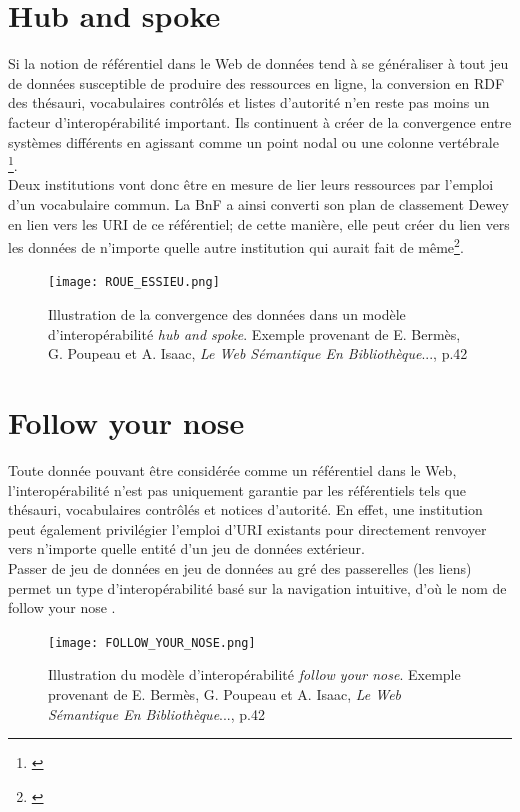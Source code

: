 \documentclass[a4paper,12pt,twoside]{book}
\begin{document}
\section{\og Hub and spoke\fg}
Si la notion de référentiel dans le Web de données tend à se généraliser à tout jeu de données susceptible de produire des ressources en ligne, la conversion en RDF des thésauri, vocabulaires contrôlés et listes d'autorité n'en reste pas moins un facteur d'interopérabilité important. Ils continuent à créer de la convergence entre systèmes différents en agissant \og comme un point nodal ou une colonne vertébrale \fg\footnote{\cite[p.~41]{bermesWebSemantiqueBibliotheque2013}}.\\

Deux institutions vont donc être en mesure de lier leurs ressources par l'emploi d'un vocabulaire commun. La BnF a ainsi converti son plan de classement Dewey en lien vers les URI de ce référentiel; de cette manière, elle peut créer du lien vers les données de n'importe quelle autre institution qui aurait fait de même\footnote{\cite[p.~54]{bermesWebSemantiqueBibliotheque2013}}. 

\begin{figure}[h]
    \centering
    \texttt{[image: ROUE\_ESSIEU.png]}
    \caption{Illustration de la convergence des données dans un modèle d'interopérabilité \textit{hub and spoke}. Exemple provenant de E. Bermès, G. Poupeau et A. Isaac, \textit{Le Web Sémantique En Bibliothèque}..., p.42}
    \label{fig:enter-label}
\end{figure}


\section{\og Follow your nose \fg}
Toute donnée pouvant être considérée comme un référentiel dans le Web, l'interopérabilité n'est pas uniquement garantie par les référentiels tels que thésauri, vocabulaires contrôlés et notices d'autorité. En effet, une institution peut également privilégier l'emploi d'URI existants pour directement renvoyer vers n'importe quelle entité d'un jeu de données extérieur.\\

Passer de jeu de données en jeu de données au gré des passerelles (les liens) permet un type d'interopérabilité basé sur la navigation intuitive, d'où le nom de \og follow your nose \fg. 

\begin{figure}[h]
    \centering
    \texttt{[image: FOLLOW\_YOUR\_NOSE.png]}
    \caption{Illustration du modèle d'interopérabilité \textit{follow your nose}. Exemple provenant de E. Bermès, G. Poupeau et A. Isaac, \textit{Le Web Sémantique En Bibliothèque}..., p.42}
    \label{fig:enter-label}
\end{figure}
\end{document}
